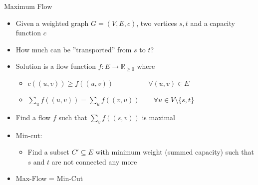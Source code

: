 \documentclass[12pt,t]{beamer}
\newcommand{\bi}{\begin{itemize}}
\newcommand{\ei}{\end{itemize}}
\begin{document}
\begin{frame}{Maximum Flow}
    \bi
\item Given a weighted graph $G = (V,E,c)$, two vertices $s,t$ and a capacity function $c$
\item How much can be ''transported'' from $s$ to $t$?
\item Solution is a flow function $f : E \rightarrow \mathbb R_{\geq 0}$ where
  \bi
    \item $c((u,v)) \geq f((u,v)) \quad \quad\quad\quad \quad \forall (u,v) \in E$
    \item $\sum_uf((u,v)) = \sum_uf((v,u)) \quad \quad \forall u \in V \setminus\{s,t\}$
  \ei
  \item Find a flow $f$ such that $\sum_v f((s,v))$ is maximal
  \vspace{10pt} \pause
  \item Min-cut:
  \bi
    \item Find a subset $C'\subseteq E$ with minimum weight (summed capacity) such that $s$ and $t$ are not connected any more
  \ei
  \vspace{10pt} \pause
  \item Max-Flow = Min-Cut
    \ei
\end{frame}
\end{document}
